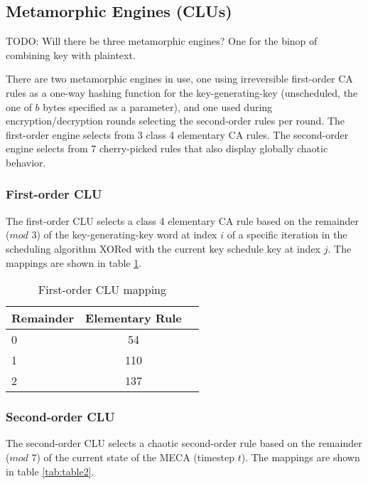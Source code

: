 \documentclass{article}
\begin{document}
\subsection{Metamorphic Engines (CLUs)}

TODO: Will there be three metamorphic engines? One for the binop of combining key with plaintext.

There are two metamorphic engines in use, one using irreversible first-order CA rules as a one-way hashing function for the key-generating-key (unscheduled, the one of $b$ bytes specified as a parameter), and one used during encryption/decryption rounds selecting the second-order rules per round. The first-order engine selects from 3 class 4 elementary CA rules. The second-order engine selects from 7 cherry-picked rules that also display globally chaotic behavior\cite{MECA-Properties}.

\subsubsection{First-order CLU}

The first-order CLU selects a class 4 elementary CA rule based on the remainder ($mod$ 3) of the key-generating-key word at index $i$ of a specific iteration in the scheduling algorithm XORed with the current key schedule key at index $j$. The mappings are shown in table \ref{tab:table1}.

\begin{table}[h!]
  \begin{center}
    \caption{First-order CLU mapping}
    \label{tab:table1}
    \begin{tabular}{l|c|r} %
      \textbf{Remainder} & \textbf{Elementary Rule}\\
      \hline
      0 & 54\\
      1 & 110\\
      2 & 137\\
    \end{tabular}
  \end{center}
\end{table}

\subsubsection{Second-order CLU}

The second-order CLU selects a chaotic second-order rule based on the remainder ($mod$ 7) of the current state of the MECA (timestep $t$). The mappings are shown in table \ref{tab:table2}.
\end{document}
